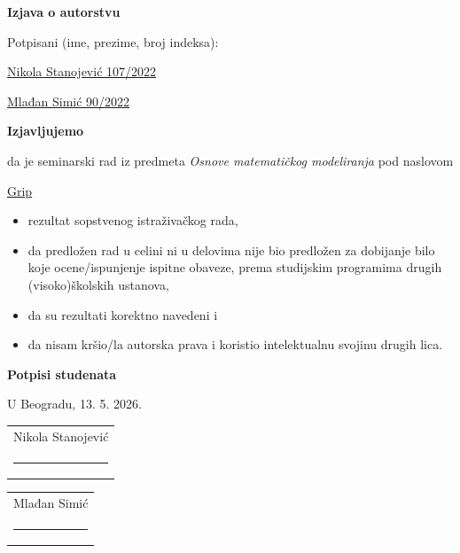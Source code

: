 \documentclass[12pt,a4paper]{article}
\begin{document}
		
	\vspace{1cm}
	\begin{center}
		\textbf{\huge Izjava o autorstvu}
	\end{center}
	
	\vspace{1.5cm}
	
	Potpisani (ime, prezime, broj indeksa):
	
	\vspace{0.5cm}
	\underline{Nikola Stanojević 107/2022}
	
	\vspace{0.2cm}
	\underline{Mlađan Simić 90/2022}
	
	\vspace{1.5cm}
	
	\begin{center}
		\textbf{Izjavljujemo}
	\end{center}
	
	da je seminarski rad iz predmeta \textit{Osnove matematičkog modeliranja} pod naslovom
	
	\vspace{0.5cm}
	\underline{Grip}
	
	\begin{itemize}
		\item rezultat sopstvenog istraživačkog rada,
		\item da predložen rad u celini ni u delovima nije bio predložen za dobijanje bilo koje ocene/ispunjenje ispitne obaveze, prema studijskim programima drugih (visoko)školskih ustanova,
		\item da su rezultati korektno navedeni i
		\item da nisam kršio/la autorska prava i koristio intelektualnu svojinu drugih lica.
	\end{itemize}
	
	\vspace{2.5cm}
	
	\begin{flushright}
		\textbf{Potpisi studenata}
	\end{flushright}
	
	\vspace{0.5cm}
	U Beogradu, 13. 5. 2026. \hfill \begin{tabular}{c} Nikola Stanojević \\ \rule{5cm}{0.4pt} \end{tabular}
	
	\vspace{0.5cm}
	\hfill \begin{tabular}{c} Mlađan Simić \\ \rule{5cm}{0.4pt} \end{tabular}
	
	
\end{document}
